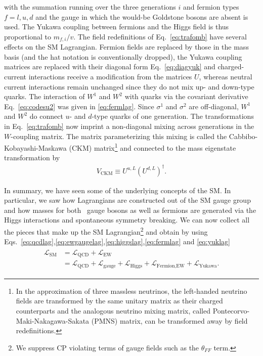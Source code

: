with the summation running over the three generations $i$ and fermion
types $f=l,u,d$ and the gauge in which the would-be Goldstone bosons are absent is used. The Yukawa coupling between fermions and the Higgs
field is thus proportional to $m_{f,i}/v$. The field redefinitions of
Eq.~\eqref{eq:trafomb} have several effects on the SM
Lagrangian. Fermion fields are replaced by those in the mass basis
(and the hat notation is conventionally dropped),
the Yukawa coupling matrices are replaced with their diagonal form
Eq.~\eqref{eq:diagyuk} and charged-current interactions receive a
modification from the matrices $U$, whereas neutral current
interactions remain unchanged since they do not mix up- and down-type quarks. The interaction of $W^{1}$ and $W^2$
with quarks via the
covariant derivative Eq.~\eqref{eq:codesu2} was given in
\eqref{eq:fermlag}. Since $\sigma^1$ and $\sigma^2$ are off-diagonal,
$W^{1}$ and $W^2$ do connect $u$- and $d$-type
quarks of one generation. The transformations in
Eq.~\eqref{eq:trafomb} now imprint a non-diagonal mixing across generations in the $W$-coupling
matrix. The matrix parameterizing this mixing is called the
Cabbibo-Kobayashi-Maskawa \cite{Cabibbo1963,Kobayashi1973} (CKM)
matrix\footnote{In the approximation of three massless neutrinos, the left-handed neutrino fields are transformed by the same unitary matrix as their charged counterparts and the analogous neutrino mixing matrix, called Pontecorvo-Maki-Nakagawa-Sakata (PMNS) matrix, can be transformed away by field redefinitions.} and connected to the mass eigenstate transformation by
\begin{align}
  V_{\text{CKM}} \equiv U^{u,L}\left(U^{d,L}\right)^{\dagger}.
\end{align}

In summary, we have seen some of the underlying concepts of the
SM. In particular, we saw how Lagrangians are constructed out of the SM gauge
group and how masses for both \ew~gauge bosons as well as fermions are generated via the Higgs interactions and spontaneous symmetry
breaking. We can now collect all the pieces that make up the SM Lagrangian\footnote{We suppress CP violating terms of gauge fields such as the $\theta_{FF}$ term.} and obtain by using
Eqs.~\eqref{eq:qcdlag},\eqref{eq:ewgaugelag},\eqref{eq:higgslag},\eqref{eq:fermlag}
and \eqref{eq:yuklag}
\begin{align}
\begin{split}
  \mathcal{L}_{\text{SM}}&=\mathcal{L}_{\text{QCD}}+\mathcal{L}_{\text{EW}}\\
&=\mathcal{L}_{\text{QCD}}+\mathcal{L}_{\text{gauge}}+\mathcal{L}_{\text{Higgs}}+\mathcal{L}_{\text{Fermion,EW}}+\mathcal{L}_{\text{Yukawa}}.
\end{split}
\end{align}



